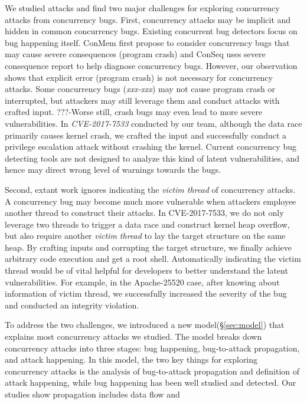 We studied \nattacks attacks and find two major challenges for exploring concurrency attacks from concurrency bugs. 
First, concurrency attacks may be implicit and hidden in common concurrency bugs. 
Existing concurrent bug detectors focus on bug happening itself. 
ConMem\cite{conmem:asplos10} first propose to 
consider concurrency bugs that may cause severe consequences (\eg program crash)
and ConSeq\cite{conseq:asplos11} uses severe consequence report to help diagnose concurrency bugs. 
However, our observation shows that explicit error (\eg program crash) is not necessary for concurrency 
attacks. Some concurrency bugs (\eg \emph{xxx-xxx}) may not cause program crash or interrupted, 
but attackers may still leverage them and conduct attacks with crafted input. 
%
???-Worse still, crash bugs may even lead to more severe vulnerabilities. 
In \emph{CVE-2017-7533} conducted by our team, although the data race primarily causes kernel crash, 
we crafted the input and successfully conduct a privilege escalation attack without crashing the kernel.
Current concurrency bug detecting tools are not designed to analyze this kind of latent vulnerabilities, 
and hence may direct wrong level of warnings towards the bugs.  


Second, extant work ignores indicating the \emph{victim thread} of concurrency attacks.
A concurrency bug may become much more vulnerable when attackers employee another thread to construct 
their attacks. 
In CVE-2017-7533, we do not only leverage two threads to trigger a data race and construct kernel heap overflow, 
but also require another \emph{victim thread} to lay the target structure on the same heap. 
By crafting inputs and corrupting the target structure, we finally achieve arbitrary code execution and get a root shell. 
Automatically indicating the victim thread would be of vital helpful for developers to better understand the latent vulnerabilities.
For example, in the Apache-25520 case, after knowing about information of victim thread, 
we successfully increased the severity of the bug and conducted an integrity violation.


To address the two challenges, we introduced a new model(\S\ref{sec:model}) 
that explains most concurrency attacks we studied. 
The model breaks down concurrency attacks into three stages: bug happening, 
bug-to-attack propagation, and attack happening. In this model, 
the two key things for exploring concurrency attacks is 
the analysis of bug-to-attack propagation and definition of attack happening, 
while bug happening has been well studied and detected. Our studies show propagation 
includes data flow and  



